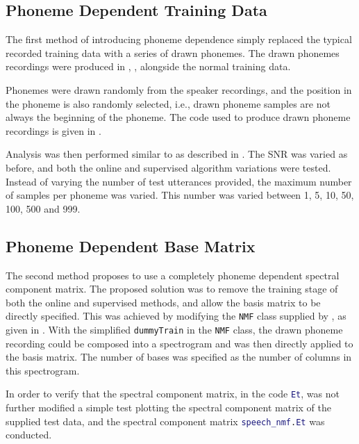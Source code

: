 \subsection{\label{sub:Phoneme-Training}Phoneme Dependent Training Data}

The first method of introducing phoneme dependence simply replaced
the typical recorded training data with a series of drawn phonemes.
The drawn phonemes recordings were produced in ,
\textit{}, alongside the normal training
data.

Phonemes were drawn randomly from the speaker recordings, and the
position in the phoneme is also randomly selected, i.e., drawn phoneme
samples are not always the beginning of the phoneme. The code used
to produce drawn phoneme recordings is given in .

Analysis was then performed similar to as described in .
The \ac{SNR} was varied as before, and both the online and supervised
algorithm variations were tested. Instead of varying the number of
test utterances provided, the maximum number of samples per phoneme
was varied. This number was varied between 1, 5, 10, 50, 100, 500
and 999.


\subsection{\label{sub:Phoneme-Base}Phoneme Dependent Base Matrix}

The second method proposes to use a completely phoneme dependent spectral
component matrix. The proposed solution was to remove the training
stage of both the online and supervised methods, and allow the basis
matrix to be directly specified. This was achieved by modifying the
\lstinline[language=bash]!NMF! class supplied by \citet{mohammadiha2013supervised},
as given in . With the simplified \lstinline[language=bash]!dummyTrain!
in the \lstinline[language=bash]!NMF! class, the drawn phoneme recording
could be composed into a spectrogram and was then directly applied
to the basis matrix. The number of bases was specified as the number
of columns in this spectrogram.

In order to verify that the spectral component matrix, in the code
\lstinline[language=Matlab]!Et!, was not further modified a simple
test plotting the spectral component matrix of the supplied test data,
and the spectral component matrix \lstinline[language=Matlab]!speech_nmf.Et!
was conducted.
